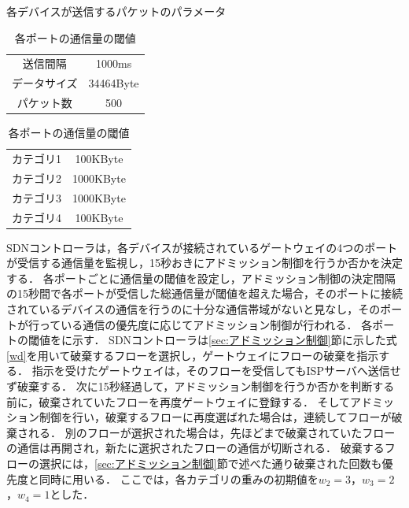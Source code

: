 \documentclass[a4paper,11pt,uplatex]{ujreport}
\begin{document}
  \begin{table}[tb]
    \begin{minipage}[c]{0.5\hsize}
      \caption{各デバイスが送信するパケットのパラメータ}
      \label{tab:packetParameter}
      \centering
      \begin{tabular}{cc}
        \hline
        送信間隔 & 1000ms\\
        データサイズ & 34464Byte\\
        パケット数 & 500\\
        \hline
      \end{tabular}
    \end{minipage}
    \begin{minipage}[c]{0.5\hsize}
      \caption{各ポートの通信量の閾値}
      \label{tab:threshold}
      \centering
      \begin{tabular}{cc}
        \hline
        カテゴリ1 & 100KByte\\
        カテゴリ2 & 1000KByte\\
        カテゴリ3 & 1000KByte\\
        カテゴリ4 & 100KByte\\
        \hline
      \end{tabular}
    \end{minipage}
  \end{table}

  SDNコントローラは，各デバイスが接続されているゲートウェイの4つのポートが受信する通信量を監視し，15秒おきにアドミッション制御を行うか否かを決定する．
  各ポートごとに通信量の閾値を設定し，アドミッション制御の決定間隔の15秒間で各ポートが受信した総通信量が閾値を超えた場合，そのポートに接続されているデバイスの通信を行うのに十分な通信帯域がないと見なし，そのポートが行っている通信の優先度に応じてアドミッション制御が行われる．
  各ポートの閾値をに示す．
  SDNコントローラは\ref{sec:アドミッション制御}節に示した式\ref{wd}を用いて破棄するフローを選択し，ゲートウェイにフローの破棄を指示する．
  指示を受けたゲートウェイは，そのフローを受信してもISPサーバへ送信せず破棄する．
  次に15秒経過して，アドミッション制御を行うか否かを判断する前に，破棄されていたフローを再度ゲートウェイに登録する．
  そしてアドミッション制御を行い，破棄するフローに再度選ばれた場合は，連続してフローが破棄される．
  別のフローが選択された場合は，先ほどまで破棄されていたフローの通信は再開され，新たに選択されたフローの通信が切断される．
  破棄するフローの選択には，\ref{sec:アドミッション制御}節で述べた通り破棄された回数も優先度と同時に用いる．
  ここでは，各カテゴリの重みの初期値を$w_2=3$，$w_3=2$，$w_4=1$とした．\par
\end{document}
